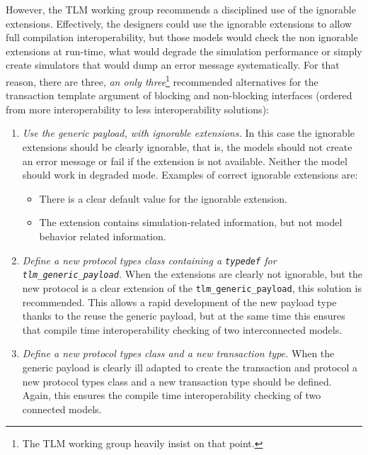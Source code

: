 {However, the TLM working group recommends a disciplined use of the ignorable extensions.
Effectively, the designers could use the ignorable extensions to allow full compilation interoperability, but those models would check the non ignorable extensions at run-time, what would degrade the simulation performance or simply create simulators that would dump an error message systematically.
For that reason, there are three, \emph{an only three}\footnote{The TLM working group heavily insist on that point.} recommended alternatives for the transaction template argument of blocking and non-blocking interfaces (ordered from more interoperability to less interoperability solutions):
\begin{enumerate}
	\item \emph{Use the generic payload, with ignorable extensions.}\newline
	In this case the ignorable extensions should be clearly ignorable, that is, the models should not create an error message or fail if the extension is not available.
	Neither the model should work in degraded mode.
	Examples of correct ignorable extensions are:
	\begin{itemize}
		\item There is a clear default value for the ignorable extension.
		\item The extension contains simulation-related information, but not model behavior related information.
	\end{itemize}
	\item \emph{Define a new protocol types class containing a \texttt{typedef} for \texttt{tlm\_generic\_payload}.}\newline
	When the extensions are clearly not ignorable, but the new protocol is a clear extension of the \texttt{tlm\_generic\_payload}, this solution is recommended.
	This allows a rapid development of the new payload type thanks to the reuse the generic payload, but at the same time this ensures that compile time interoperability checking of two interconnected models.
	\item \emph{Define a new protocol types class and a new transaction type.}\newline
	When the generic payload is clearly ill adapted to create the transaction and protocol a new protocol types class and a new transaction type should be defined.
	Again, this ensures the compile time interoperability checking of two connected models.
\end{enumerate}

}
